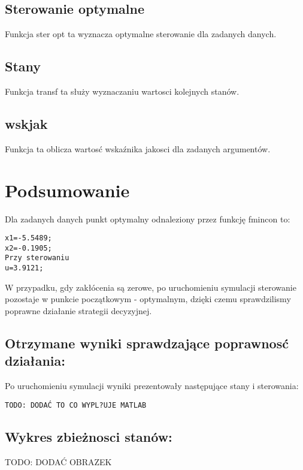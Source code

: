 \documentclass[11pt,a4paper]{article}
\begin{document}
\subsection{Sterowanie optymalne}
Funkcja ster opt ta wyznacza optymalne sterowanie dla zadanych danych.

\subsection{Stany}
Funkcja transf ta służy wyznaczaniu wartosci kolejnych stanów.
\subsection{wskjak}
Funkcja ta oblicza wartosć wskaźnika jakosci dla zadanych argumentów.

\section{Podsumowanie}
Dla zadanych danych punkt optymalny odnaleziony przez funkcję fmincon to:
\begin{verbatim}
x1=-5.5489;
x2=-0.1905; 
Przy sterowaniu 
u=3.9121;
\end{verbatim}
W przypadku, gdy zakłócenia są zerowe, po uruchomieniu symulacji sterowanie pozostaje w punkcie początkowym - optymalnym, dzięki czemu sprawdzilismy poprawne działanie strategii decyzyjnej.
\subsection{Otrzymane wyniki sprawdzające poprawnosć działania:}
Po uruchomieniu symulacji wyniki prezentowały następujące stany i sterowania:
\begin{verbatim}
TODO: DODAĆ TO CO WYPL?UJE MATLAB
\end{verbatim}
\subsection{Wykres zbieżnosci stanów:}
TODO: DODAĆ OBRAZEK
\end{document}

